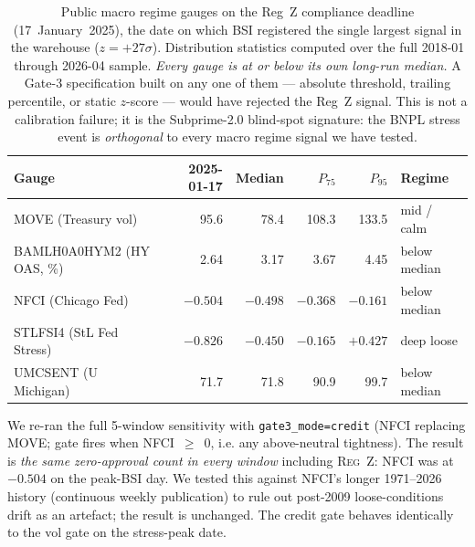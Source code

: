\documentclass[11pt,letterpaper]{article}
\begin{document}
\begin{table}[H]
\centering
\small
\begin{tabular}{lrrrrl}
\toprule
\textbf{Gauge} & \textbf{2025-01-17} & \textbf{Median} &
\textbf{$P_{75}$} & \textbf{$P_{95}$} & \textbf{Regime}\\
\midrule
MOVE (Treasury vol)        & 95.6    & 78.4    & 108.3   & 133.5   & mid / calm\\
BAMLH0A0HYM2 (HY OAS, \%)  & 2.64    & 3.17    & 3.67    & 4.45    & below median\\
NFCI (Chicago Fed)         & $-0.504$ & $-0.498$ & $-0.368$ & $-0.161$ & below median\\
STLFSI4 (StL Fed Stress)   & $-0.826$ & $-0.450$ & $-0.165$ & $+0.427$ & deep loose\\
UMCSENT (U Michigan)       & 71.7    & 71.8    & 90.9    & 99.7    & below median\\
\bottomrule
\end{tabular}
\caption{Public macro regime gauges on the Reg~Z compliance deadline
(17~January~2025), the date on which BSI registered the single
largest signal in the warehouse ($z = +27\sigma$). Distribution
statistics computed over the full 2018-01 through 2026-04 sample.
\emph{Every gauge is at or below its own long-run median.} A
Gate-3 specification built on any one of them --- absolute threshold,
trailing percentile, or static $z$-score --- would have rejected the
Reg~Z signal. This is not a calibration failure; it is the
Subprime-2.0 blind-spot signature: the BNPL stress event is
\emph{orthogonal} to every macro regime signal we have tested.}
\label{tab:macroblind}
\end{table}

We re-ran the full 5-window sensitivity with
\texttt{gate3\_mode=credit} (NFCI replacing MOVE; gate fires when
NFCI~$\geq$~0, i.e. any above-neutral tightness). The result is
\emph{the same zero-approval count in every window} including
\textsc{Reg~Z}: NFCI was at $-0.504$ on the peak-BSI day. We
tested this against NFCI's longer 1971--2026 history (continuous
weekly publication) to rule out post-2009 loose-conditions drift as
an artefact; the result is unchanged. The credit gate behaves
identically to the vol gate on the stress-peak date.
\end{document}

